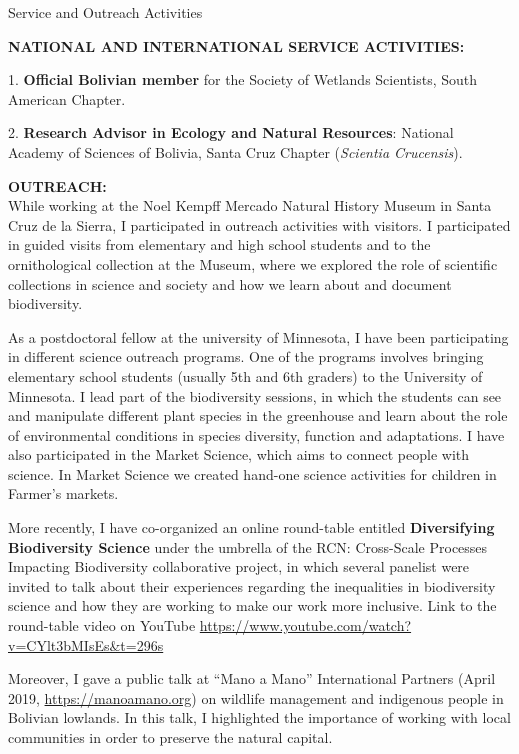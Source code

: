 \documentclass{resume} %
\begin{document}
\begin{rSection}{Service and Outreach Activities}
\begin{multicols}{2}
\end{multicols}

\textbf{NATIONAL AND INTERNATIONAL SERVICE ACTIVITIES:} \smallskip 

\item 1. \textbf{Official Bolivian member} for the Society of Wetlands Scientists, South American Chapter. 

\item 2. \textbf{Research Advisor in Ecology and Natural Resources}: National Academy of Sciences of Bolivia, Santa Cruz Chapter ({\em Scientia Crucensis}). 

\textbf{OUTREACH:} \smallskip \\ 
While working at the Noel Kempff Mercado Natural History Museum in Santa Cruz de la Sierra, I participated in outreach activities with visitors. I participated in guided visits from elementary and high school students and to the ornithological collection at the Museum, where we explored the role of scientific collections in science and society and how we learn about and document biodiversity.

As a postdoctoral fellow at the university of Minnesota, I have been participating in different science outreach programs. One of the programs involves bringing elementary school students (usually 5th and 6th graders) to the University of Minnesota. I lead part of the biodiversity sessions, in which the students can see and manipulate different plant species in the greenhouse and learn about the role of environmental conditions in species diversity, function and adaptations. I have also participated in the Market Science, which aims to connect people with science. In Market Science we created hand-one science activities for children in Farmer’s markets. 

More recently, I have co-organized an online round-table entitled {\bf Diversifying Biodiversity Science} under the umbrella of the RCN: Cross-Scale Processes Impacting Biodiversity collaborative project, in which several panelist were invited to talk about their experiences regarding the inequalities in biodiversity science and how they are working to make our work more inclusive. Link to the round-table video on YouTube \url{https://www.youtube.com/watch?v=CYlt3bMIsEs&t=296s} 

Moreover, I gave a public talk at “Mano a Mano” International Partners (April 2019, \url{https://manoamano.org}) on wildlife management and indigenous people in Bolivian lowlands. In this talk, I highlighted the importance of working with local communities in order to preserve the natural capital. 


\end{rSection}
\end{document}
